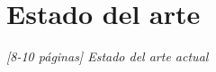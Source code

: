 \chapter{Estado del arte}
\label{chap:estado-del-arte}

\textit{[8-10 páginas] Estado del arte actual}

